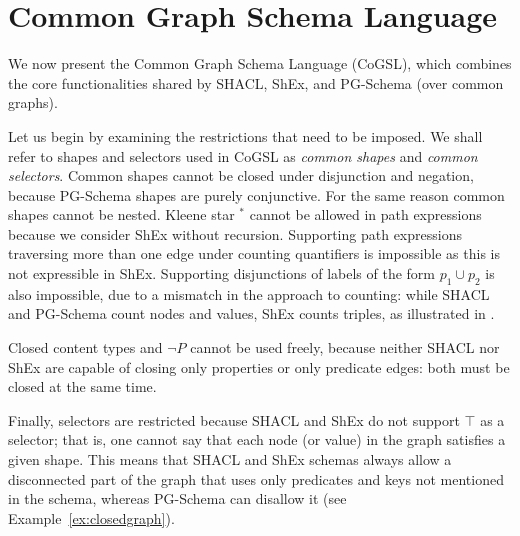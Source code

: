 \section{Common Graph Schema Language}
\label{sec:core}

We now present the Common Graph Schema Language (CoGSL), which combines the core functionalities shared by SHACL, ShEx, and PG-Schema (over common graphs). 

Let us begin by examining the restrictions that need to be imposed. We shall refer to shapes and selectors used in CoGSL as \emph{common shapes} and \emph{common selectors}. 
%
Common shapes cannot be closed under disjunction and negation, because PG-Schema shapes are purely conjunctive. For the same reason common shapes cannot be nested. 
%
Kleene star ${}^{*}$ cannot be allowed in path expressions because we consider ShEx without recursion. 
%
%
Supporting path expressions traversing more than one edge under counting quantifiers is impossible as this is not expressible in ShEx. Supporting disjunctions of labels of the form $p_1 \cup p_2$ is also impossible, due to a mismatch in the approach to counting: while SHACL and PG-Schema count nodes and values, ShEx counts triples, as illustrated in . 

Closed content types and $\lnot P$ cannot be used freely, because neither SHACL nor ShEx are capable of closing only properties or only predicate edges: both must be closed at the same time. 

Finally, selectors are restricted because SHACL and ShEx do not support $\top$ as a selector; that is, one cannot say that each node (or value) in the graph satisfies a given shape. This means that SHACL and ShEx schemas always allow a disconnected part of the graph that uses only predicates and keys not mentioned in the schema, whereas PG-Schema can disallow it (see Example~\ref{ex:closedgraph}). 

